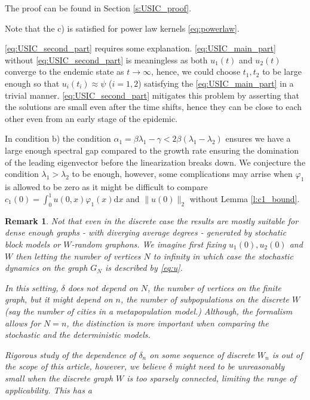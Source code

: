\documentclass{article}
\renewcommand{\d}{\mathrm{d}}
\newcommand{\1}[1]{{\mathds{1}}_{\left\{#1\right\}}}
\newtheorem{remark}{Remark}
\newcommand{\rem}[1]{{#1}}
\begin{document}
The proof can be found in Section \ref{s:USIC_proof}.

Note that the c) is satisfied for power law kernels \eqref{eq:powerlaw}.

\eqref{eq:USIC_second_part} requires some explanation.  \eqref{eq:USIC_main_part} without \eqref{eq:USIC_second_part} is meaningless as both $u_1(t)$ and $u_2(t)$ converge to the endemic state as $t \to \infty$, hence, we could choose $t_1,t_2$ to be large enough so that $u_{i}(t_i) \approx \psi$ ($i=1,2$) satisfying the \eqref{eq:USIC_main_part} in a trivial manner. \eqref{eq:USIC_second_part} mitigates this problem by asserting that the solutions are small even after the time shifts, hence they can be close to each other even from an early stage of the epidemic.

\rem{
	In condition b) the condition $\alpha_1=\beta \lambda_1-\gamma< 2 \beta (\lambda_1-\lambda_2)$ ensures we have a large enough spectral gap compared to the growth rate ensuring the domination of the leading eigenvector before the linearization breaks down. We conjecture the condition  $\lambda_1>\lambda_2$ to be enough, however, some complications may arrise when $\varphi_1$ is allowed to be zero as it might be difficult to compare $c_1(0)=\int_{0}^{1} u(0,x) \varphi_1(x) \d x$ and $\|u(0) \|_2$ without Lemma \ref{l:c1_bound}.   
} 

\rem{
\begin{remark}
Not that even in the discrete case the results are mostly suitable for dense enough graphs - with diverging average degrees - generated by stochatic block models or $W$-random graphons. We imagine first fixing $u_1(0),u_2(0)$ and $W$ then letting the number of vertices $N$ to infinity in which case the stochastic dynamics on the graph $G_N$ is described by \eqref{eq:u}.

In this setting, $\delta$ does not depend on $N$, the number of vertices on the finite graph, but it might depend on $n$, the number of subpopulations on the discrete $W$ (say the number of cities in a metapopulation model.) Although, the formalism allows for $N=n$, the distinction is more important when comparing the stochastic and the deterministic models. 

Rigorous study of the dependence of $\delta_n$ on some sequence of discrete $W_n$ is out of the scope of this article, however, we believe $\delta$ might need to be unreasonably small when the discrete graph $W$ is too sparsely connected, limiting the range of applicability. This has a 
\end{remark}
}
\end{document}
